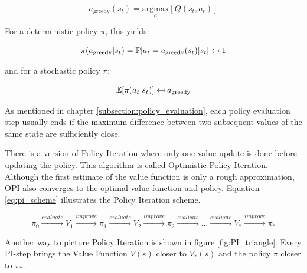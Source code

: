 \begin{equation}
a_{\text{greedy}}(s_t) = \underset{a}{\text{argmax}}[Q(s_t,a_t)]
\end{equation}

For a deterministic policy $\pi$, this yields:

\begin{equation}
\pi(a_{\text{greedy}}|s_t)=\mathbb{P}[a_t=a_{\text{greedy}}(s_t)|s_t] \mathrel{\reflectbox{\ensuremath{\mapsto}}} 1
\end{equation}

and for a stochastic policy $\pi$:

\begin{equation}
\mathbb{E}[\pi(a_t | s_t)] \mathrel{\reflectbox{\ensuremath{\mapsto}}} a_{\text{greedy}}
\end{equation}

As mentioned in chapter \ref{subsection:policy_evaluation}, each policy evaluation step usually ends if the maximum difference between two subsequent values of the same state are sufficiently close.

There is a version of Policy Iteration where only one value update is done before updating the policy. This algorithm is called Optimistic Policy Iteration. Although the first estimate of the value function is only a rough approximation, OPI also converges to the optimal value function and policy. Equation \ref{eq:pi_scheme} illustrates the Policy Iteration scheme.

\begin{equation}
\pi_0 \overset{evaluate}{\longrightarrow} V_1 \overset{improve}{\longrightarrow} \pi_1 \overset{evaluate}{\longrightarrow} V_2 \overset{improve}{\longrightarrow} \pi_2 \overset{evaluate}{\longrightarrow} ... \overset{evaluate}{\longrightarrow} V_* \overset{improve}{\longrightarrow} \pi_*
\label{eq:pi_scheme}
\end{equation}

Another way to picture Policy Iteration is shown in figure \ref{fig:PI_triangle}. Every PI-step brings the Value Function $V(s)$ closer to $V_*(s)$ and the policy $\pi$ closer to $\pi_*$.

